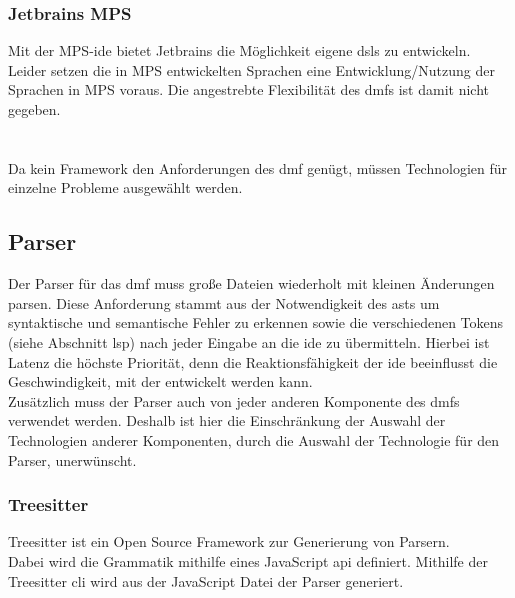 \documentclass[./einleitung.tex]{subfiles}
\begin{document}
\subsubsection{Jetbrains MPS}
Mit der MPS-\acrshort{ide} bietet Jetbrains die Möglichkeit eigene \acrshort{dsl}s zu entwickeln.\\
Leider setzen die in MPS entwickelten Sprachen eine Entwicklung/Nutzung der Sprachen in MPS voraus.
Die angestrebte Flexibilität des \acrshort{dmf}s ist damit nicht gegeben.
\\\\\\
Da kein Framework den Anforderungen des \acrshort{dmf} genügt, müssen Technologien für einzelne Probleme ausgewählt werden.
\subsection{Parser}
Der Parser für das \acrshort{dmf} muss große Dateien wiederholt mit kleinen Änderungen parsen.
Diese Anforderung stammt aus der Notwendigkeit des \acrshort{ast}s um syntaktische und semantische Fehler zu erkennen sowie die verschiedenen Tokens (siehe Abschnitt \acrshort{lsp}) nach jeder Eingabe an die \acrshort{ide} zu übermitteln.
Hierbei ist Latenz die höchste Priorität, denn die Reaktionsfähigkeit der \acrshort{ide} beeinflusst die Geschwindigkeit, mit der entwickelt werden kann. \\
Zusätzlich muss der Parser auch von jeder anderen Komponente des \acrshort{dmf}s verwendet werden.
Deshalb ist hier die Einschränkung der Auswahl der Technologien anderer Komponenten, durch die Auswahl der Technologie für den Parser, unerwünscht.

\subsubsection{Treesitter}
Treesitter ist ein Open Source Framework zur Generierung von Parsern.\\
Dabei wird die Grammatik mithilfe eines JavaScript \acrfull{api} definiert.
Mithilfe der Treesitter \acrlong{cli} wird aus der JavaScript Datei der Parser generiert. \\
\end{document}
